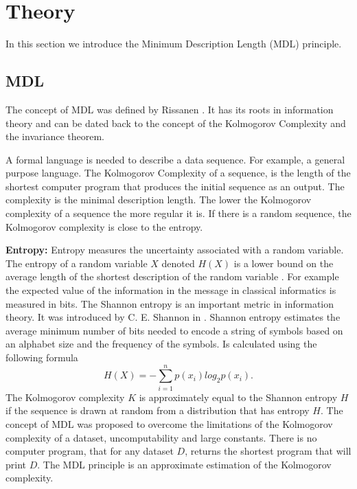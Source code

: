 \section{Theory}
In this section we introduce the Minimum Description Length (MDL) principle.
\subsection{MDL}
The concept of MDL was defined by Rissanen \cite{rissanen:short, rissanen:mdl}. It has its roots in information theory and can be dated back to the concept of the Kolmogorov Complexity and the invariance theorem.

A formal language is needed to describe a data sequence. For example, a general purpose language. The Kolmogorov Complexity of a sequence, is the length of the shortest computer program that produces the initial sequence as an output. The complexity is the minimal description length. The lower the Kolmogorov complexity of a sequence the more regular it is. 
If there is a random sequence, the Kolmogorov complexity is close to the entropy.

\textbf{Entropy: } Entropy measures the uncertainty associated with a random variable. The entropy of a random variable $X$ denoted $H(X)$ is a lower bound on the average length of the shortest description of the random variable \cite{cover:book91}. For example the expected value of the information in the message in classical informatics is measured in bits.
The Shannon entropy is an important metric in information theory. It was introduced by C. E. Shannon in \cite{Shannon:1948}. Shannon entropy estimates the average minimum number of bits needed to encode a string of symbols based on an alphabet size and the frequency of the symbols. Is calculated using the following formula $$H(X)=-\sum_{i=1}^{n}p(x_i)log_{2}p(x_i).$$ The Kolmogorov complexity $K$ is approximately equal to the Shannon entropy $H$ if the sequence is drawn at random from a distribution that has entropy $H$. 
The concept of MDL was proposed to overcome the limitations of the Kolmogorov complexity of a dataset, uncomputability and large constants. There is no computer program, that for any dataset $D$, returns the shortest program that will print $D$. The MDL principle is an approximate estimation of the Kolmogorov complexity. 

